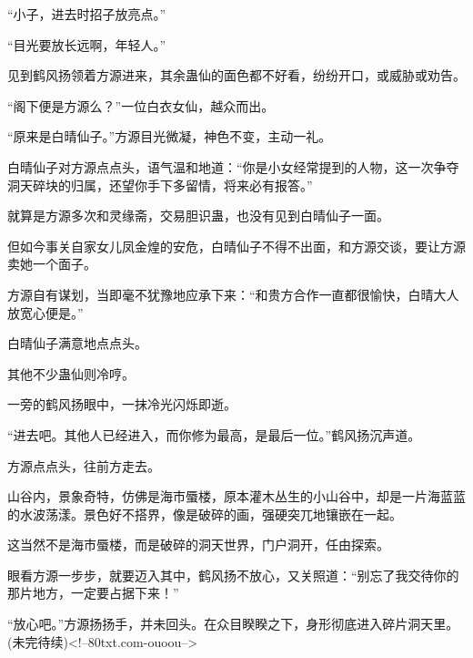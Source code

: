 \begin{this_body}
“小子，进去时招子放亮点。”

“目光要放长远啊，年轻人。”

见到鹤风扬领着方源进来，其余蛊仙的面色都不好看，纷纷开口，或威胁或劝告。

“阁下便是方源么？”一位白衣女仙，越众而出。

“原来是白晴仙子。”方源目光微凝，神色不变，主动一礼。

白晴仙子对方源点点头，语气温和地道：“你是小女经常提到的人物，这一次争夺洞天碎块的归属，还望你手下多留情，将来必有报答。”

就算是方源多次和灵缘斋，交易胆识蛊，也没有见到白晴仙子一面。

但如今事关自家女儿凤金煌的安危，白晴仙子不得不出面，和方源交谈，要让方源卖她一个面子。

方源自有谋划，当即毫不犹豫地应承下来：“和贵方合作一直都很愉快，白晴大人放宽心便是。”

白晴仙子满意地点点头。

其他不少蛊仙则冷哼。

一旁的鹤风扬眼中，一抹冷光闪烁即逝。

“进去吧。其他人已经进入，而你修为最高，是最后一位。”鹤风扬沉声道。

方源点点头，往前方走去。

山谷内，景象奇特，仿佛是海市蜃楼，原本灌木丛生的小山谷中，却是一片海蓝蓝的水波荡漾。景色好不搭界，像是破碎的画，强硬突兀地镶嵌在一起。

这当然不是海市蜃楼，而是破碎的洞天世界，门户洞开，任由探索。

眼看方源一步步，就要迈入其中，鹤风扬不放心，又关照道：“别忘了我交待你的那片地方，一定要占据下来！”

“放心吧。”方源扬扬手，并未回头。在众目睽睽之下，身形彻底进入碎片洞天里。(未完待续)<!--80txt.com-ouoou-->

\end{this_body}

